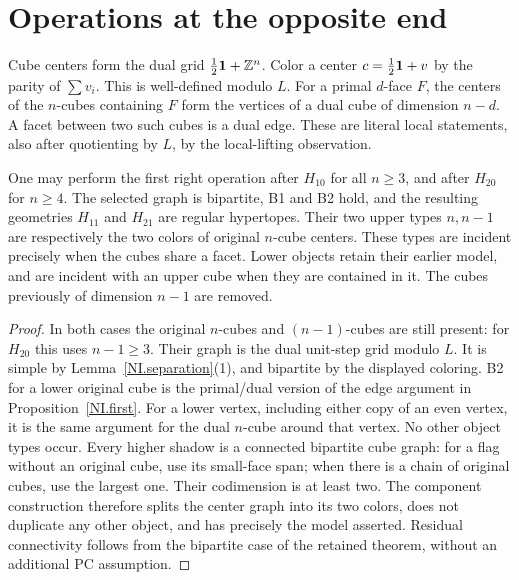 \section{Operations at the opposite end}
Cube centers form the dual grid $\frac12\mathbf1+\mathbb Z^n$. Color a
center $c=\frac12\mathbf1+v$ by the parity of $\sum v_i$.
This is well-defined modulo $L$. For a primal $d$-face $F$, the
centers of the $n$-cubes containing $F$ form the vertices of a
dual cube of dimension $n-d$. A facet between two such cubes
is a dual edge. These are literal local statements, also after
quotienting by $L$, by the local-lifting observation.

\begin{proposition}\label{NI.oppositefirst}
One may perform the first right operation after $H_{10}$ for all
$n\ge3$, and after $H_{20}$ for $n\ge4$. The selected graph is
bipartite, B1 and B2 hold, and the resulting geometries $H_{11}$
and $H_{21}$ are regular hypertopes.
Their two upper types $n,n-1$ are respectively the two colors of
original $n$-cube centers. These types are incident precisely when
the cubes share a facet. Lower objects retain their earlier model,
and are incident with an upper cube when they are contained in it.
The cubes previously of dimension $n-1$ are removed.
\end{proposition}
\begin{proof}
In both cases the original $n$-cubes and $(n-1)$-cubes are still
present: for $H_{20}$ this uses $n-1\ge3$. Their graph is the
dual unit-step grid modulo $L$. It is simple by
Lemma~\ref{NI.separation}(1), and bipartite by the displayed coloring.
B2 for a lower original cube is the primal/dual version of the
edge argument in Proposition~\ref{NI.first}. For a lower vertex,
including either copy of an even vertex, it is the same argument
for the dual $n$-cube around that vertex. No other object types
occur. Every higher shadow is a connected bipartite cube graph:
for a flag without an original cube, use its small-face span;
when there is a chain of original cubes, use the largest one.
Their codimension is at least two. The component construction
therefore splits the center graph into its two colors, does not
duplicate any other object, and has precisely the model asserted.
Residual connectivity follows from the bipartite case of the
retained theorem, without an additional PC assumption.
\end{proof}


